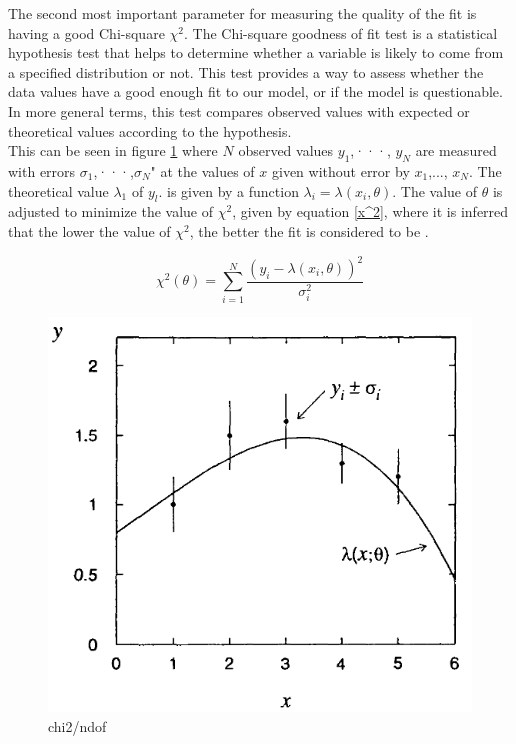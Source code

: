 The second most important parameter for measuring the quality of the fit is having a good  Chi-square $\chi^2$. The  Chi-square goodness of fit test is a statistical hypothesis test that helps to determine whether a variable is likely to come from a specified distribution or not. This test provides a way to assess whether the data values have a good enough fit to our model, or if the model is questionable. In more general terms, this test compares observed values with expected or theoretical values according to the hypothesis.\\

This can be seen in figure \ref{chi2} where $N$ observed values $y_{1}$,···, $y_{N}$ are measured with errors $\sigma_{1}$,···,$\sigma_{N}$" at the values of $x$ given without error by $x_{1}$,..., $x_{N}$. The theoretical  value $\lambda_{1}$ of $y_{l}$. is given by a function $\lambda_{i} = \lambda(x_{i},\theta)$. The value of $\theta$ is adjusted to minimize the value of $\chi^2$, given by equation \ref{x^2}, where it is inferred that the lower the value of $\chi^2$, the better the fit is considered to be \cite{Statistical_Data_Analysis}.

\begin{equation}
\chi^{2}(\theta)=\sum_{i=1}^{N} \frac{(y_{i}-\lambda(x_{i},\theta))^{2}}{\sigma_{i}^{2}}
\label{x^2}
\end{equation}

\begin{center}
  \begin{figure}[h!]
    \centering
    \includegraphics[scale=.35]{Chapter4/chi-square.png}
    \caption[chi-square definition]{ chi2/ndof } 
    \label{chi2}
  \end{figure}
\end{center}

